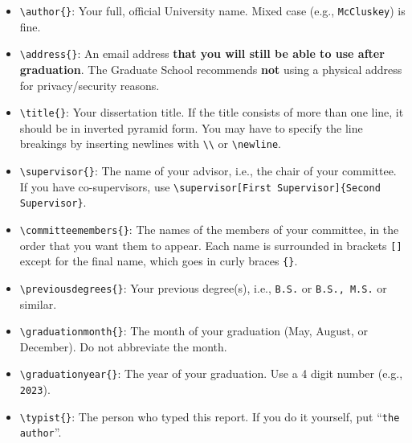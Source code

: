 \begin{itemize}
    \item \verb+\author{}+: %
    Your full, official University name.
    Mixed case (e.g., \texttt{McCluskey}) is fine.

    \item \verb+\address{}+: %
    An email address \textbf{that you will still be able to use after graduation}.
    The Graduate School recommends \textbf{not} using a physical address for privacy/security reasons.

    \item \verb+\title{}+: %
    Your dissertation title.
    If the title consists of more than one line, it should be in inverted pyramid form.
    You may have to specify the line breakings by inserting newlines with \verb+\\+ or \verb+\newline+.

    \item \verb+\supervisor{}+: %
    The name of your advisor, i.e., the chair of your committee.
    If you have co-supervisors, use \verb+\supervisor[First Supervisor]{Second Supervisor}+.

    \item \verb+\committeemembers{}+: %
    The names of the members of your committee, in the order that you want them to appear.
    Each name is surrounded in brackets \verb"[]" except for the final name, which goes in curly braces \verb"{}".

    \item \verb+\previousdegrees{}+: %
    Your previous degree(s), i.e., \texttt{B.S.} or \texttt{B.S., M.S.} or similar.

    \item \verb+\graduationmonth{}+: %
    The month of your graduation (May, August, or December).
    Do not abbreviate the month.

    \item \verb+\graduationyear{}+: %
    The year of your graduation.
    Use a 4 digit number (e.g., \texttt{2023}).

    \item \verb+\typist{}+: %
    The person who typed this report.
    If you do it yourself, put ``\texttt{the author}''.
\end{itemize}

